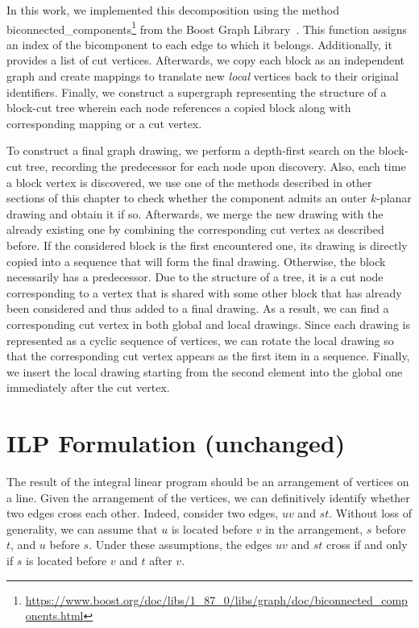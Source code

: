 In this work, we implemented this decomposition using the method \textsf{biconnected\_compo\-nents}\footnote{\url{https://www.boost.org/doc/libs/1_87_0/libs/graph/doc/biconnected_components.html}} from the Boost Graph Library~\cite{boost}. This function assigns an index of the bicomponent to each edge to which it belongs. Additionally, it provides a list of cut vertices. Afterwards, we copy each block as an independent graph and create mappings to translate new \emph{local} vertices back to their original identifiers. Finally, we construct a supergraph representing the structure of a block-cut tree wherein each node references a copied block along with corresponding mapping or a cut vertex.

To construct a final graph drawing, we perform a depth-first search on the block-cut tree, recording the predecessor for each node upon discovery. Also, each time a block vertex is discovered, we use one of the methods described in other sections of this chapter to check whether the component admits an outer \(k\)-planar drawing and obtain it if so. Afterwards, we merge the new drawing with the already existing one by combining the corresponding cut vertex as described before. If the considered block is the first encountered one, its drawing is directly copied into a sequence that will form the final drawing. Otherwise, the block necessarily has a predecessor. Due to the structure of a tree, it is a cut node corresponding to a vertex that is shared with some other block that has already been considered and thus added to a final drawing. As a result, we can find a corresponding cut vertex in both global and local drawings. Since each drawing is represented as a cyclic sequence of vertices, we can rotate the local drawing so that the corresponding cut vertex appears as the first item in a sequence. Finally, we insert the local drawing starting from the second element into the global one immediately after the cut vertex.

\section{ILP Formulation (unchanged)}\label{sec:ILP-def}

The result of the integral linear program should be an arrangement of vertices on a line.
Given the arrangement of the vertices, we can definitively identify whether two edges cross each other.
Indeed, consider two edges, $uv$ and $st$.
Without loss of generality, we can assume that $u$ is located before $v$ in the arrangement, $s$ before $t$, and $u$ before $s$.
Under these assumptions, the edges $uv$ and $st$ cross if and only if $s$ is located before $v$ and $t$ after $v$.

